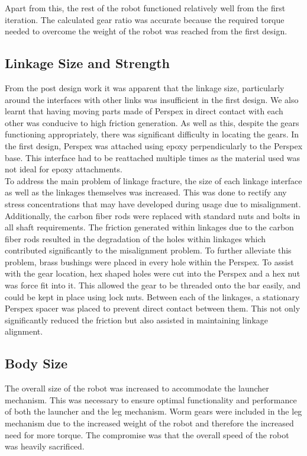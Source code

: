 Apart from this, the rest of the robot functioned relatively well from the first iteration. The calculated gear ratio was accurate because the required torque needed to overcome the weight of the robot was reached from the first design.\\

\subsection{Linkage Size and Strength}
\label{sub:Linkage Size and Strength}
  From the post design work it was apparent that the linkage size, particularly around the interfaces with other links was insufficient in the first design. We also learnt that having moving parts made of Perspex in direct contact with each other was conducive to high friction generation. As well as this, despite the gears functioning appropriately, there was significant difficulty in locating the gears. In the first design, Perspex was attached using epoxy perpendicularly to the Perspex base. This interface had to be reattached multiple times as the material used was not ideal for epoxy attachments.\\

  To address the main problem of linkage fracture, the size of each linkage interface as well as the linkages themselves was increased. This was done to rectify any stress concentrations that may have developed during usage due to misalignment. Additionally, the carbon fiber rods were replaced with standard nuts and bolts in all shaft requirements. The friction generated within linkages due to the carbon fiber rods resulted in the degradation of the holes within linkages which contributed significantly to the misalignment problem. To further alleviate this problem, brass bushings were placed in every hole within the Perspex. To assist with the gear location, hex shaped holes were cut into the Perspex and a hex nut was force fit into it. This allowed the gear to be threaded onto the bar easily, and could be kept in place using lock nuts. Between each of the linkages, a stationary Perspex spacer was placed to prevent direct contact between them. This not only significantly reduced the friction but also assisted in maintaining linkage alignment.\\

\subsection{Body Size}
\label{sub:Body Size}
  The overall size of the robot was increased to accommodate the launcher mechanism. This was necessary to ensure optimal functionality and performance of both the launcher and the leg mechanism. Worm gears were included in the leg mechanism due to the increased weight of the robot and therefore the increased need for more torque. The compromise was that the overall speed of the robot was heavily sacrificed.

